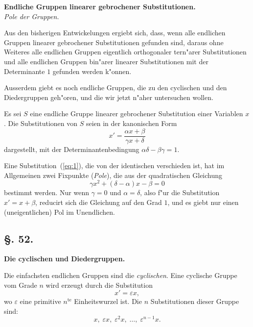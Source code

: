 \documentclass[12pt,a4paper]{article}
\theoremstyle{weber}
\begin{document}
\begin{center}
\textbf{Endliche Gruppen linearer gebrochener Substitutionen.}\\[4pt]
\textit{Pole der Gruppen.}
\end{center}

\bigskip

Aus den bisherigen Entwickelungen ergiebt sich, dass, wenn alle endlichen Gruppen linearer gebrochener Substitutionen gefunden sind, daraus ohne Weiteres alle endlichen Gruppen eigentlich orthogonaler tern"arer Substitutionen und alle endlichen Gruppen bin"arer linearer Substitutionen mit der Determinante $1$ gefunden werden k"onnen.

Ausserdem giebt es noch endliche Gruppen, die zu den cyclischen und den Diedergruppen geh"oren, und die wir jetzt n"aher untersuchen wollen.

Es sei $S$ eine endliche Gruppe linearer gebrochener Substitution einer Variablen $x$. Die Substitutionen von $S$ seien in der kanonischen Form
\begin{equation}\label{eq:1}
x' = \frac{\alpha x + \beta}{\gamma x + \delta}
\end{equation}
dargestellt, mit der Determinantenbedingung $\alpha\delta - \beta\gamma = 1$.

Eine Substitution~(\ref{eq:1}), die von der identischen verschieden ist, hat im Allgemeinen zwei Fixpunkte (\textit{Pole}), die aus der quadratischen Gleichung
\begin{equation}\label{eq:2}
\gamma x^2 + (\delta - \alpha)x - \beta = 0
\end{equation}
bestimmt werden. Nur wenn $\gamma = 0$ und $\alpha = \delta$, also f"ur die Substitution $x' = x + \beta$, reducirt sich die Gleichung auf den Grad $1$, und es giebt nur einen (uneigentlichen) Pol im Unendlichen.

\newpage
\subsection*{\S. 52.}

\begin{center}
\textbf{Die cyclischen und Diedergruppen.}
\end{center}

\bigskip

Die einfachsten endlichen Gruppen sind die \textit{cyclischen}. Eine cyclische Gruppe vom Grade $n$ wird erzeugt durch die Substitution
\begin{equation}\label{eq:1}
x' = \varepsilon x,
\end{equation}
wo $\varepsilon$ eine primitive $n^{\text{te}}$ Einheitswurzel ist. Die $n$ Substitutionen dieser Gruppe sind:
\begin{equation}\label{eq:2}
x,\; \varepsilon x,\; \varepsilon^2 x,\; \ldots,\; \varepsilon^{n-1} x.
\end{equation}
\end{document}
